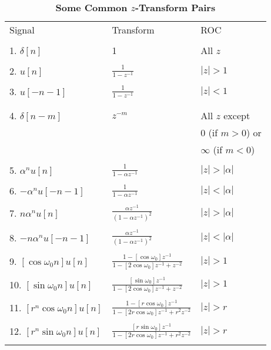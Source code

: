 \documentclass[12pt]{article}
\numberwithin{equation}{section}
\begin{document}
%
%

\begin{table}[htbp]
\vspace*{-1.0in}
\begin{center}
\caption{\bf Some Common $z$-Transform Pairs}

\begin{tabular}{lll}
& & \\ \hline
Signal                   & Transform         & ROC \\ \hline
\\
1.  $\delta[n]$          & 1                  & All $z$ \\
\\
2.  $ u[n] $             & $ \frac{1}{1 - z^{-1}}$  &  $|z| > 1$ \\
\\
3.  $ u[-n - 1] $        & $ \frac{1}{1 - z^{-1}}$  & $ |z| < 1$ \\
  \\
\\
4.  $ \delta[n - m] $    & $ z^{-m} $  & All $z$ except\\  & &0 (if $ m > 0$) or \\
& & $\infty$ (if $m < 0$) \\
\\
5.  $ \alpha^n u[n]$      & $\frac{1}{1 - \alpha z^{-1}} $
   & $|z| > |\alpha|$ \\
\\
6.  $ - \alpha^n u[-n - 1]$ & $\frac{1}{1 - \alpha z^{-1}}$
   & $ |z| < |\alpha|$ \\
\\
7.  $ n\alpha^n u[n] $       & $\frac{\alpha z^{-1}}{(1 - \alpha
z^{-1})^2} $
   & $|z| > |\alpha|$ \\
\\
8.  $ -n \alpha^n u[-n - 1]$ & $\frac{\alpha z^{-1}}{(1 - \alpha
z^{-1})^2} $
   & $ |z| < |\alpha |$ \\
\\
9.  $ [\cos \omega_0 n]u[n]$ & $\frac{1 - [\cos \omega_0
]z^{-1}}{1 - [2 \cos         \omega_0]z^{-1} + z^{-2}}$
& $ |z| > 1 $ \\
\\
10. $ [\sin \omega_0 n]u[n]$
    & $\frac{[\sin \omega_0]z^{-1}}{1 - [2 \cos \omega_0]z^{-1} + z^{-2}}$
    & $ |z| > 1 $ \\
\\
11.  $ [r^n \cos \omega_0 n]u[n]$
    & $ \frac{1 - [r\cos \omega_0 ]z^{-1}}{1 - [2 r \cos \omega_0]z^{-1} + r^2  z^{-2}}$
    & $|z| > r $ \\
\\
12.  $ [r^n \sin \omega_0 n]u[n]$
    & $\frac{[r \sin \omega_0]z^{-1}}{1 - [2r \cos \omega_0]z^{-1} + r^2  z^{-2}}$
    & $|z| > r $ \\ \\ \hline
\end{tabular}
\end{center}
\end{table}
\end{document}
